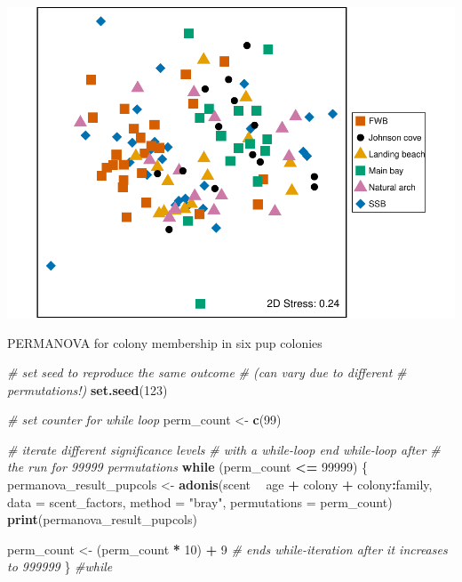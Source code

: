 \documentclass[]{article}
\newenvironment{Shaded}{\begin{snugshade}}{\end{snugshade}}
\newcommand{\KeywordTok}[1]{\textcolor[rgb]{0.13,0.29,0.53}{\textbf{#1}}}
\newcommand{\DataTypeTok}[1]{\textcolor[rgb]{0.13,0.29,0.53}{#1}}
\newcommand{\DecValTok}[1]{\textcolor[rgb]{0.00,0.00,0.81}{#1}}
\newcommand{\StringTok}[1]{\textcolor[rgb]{0.31,0.60,0.02}{#1}}
\newcommand{\CommentTok}[1]{\textcolor[rgb]{0.56,0.35,0.01}{\textit{#1}}}
\newcommand{\ControlFlowTok}[1]{\textcolor[rgb]{0.13,0.29,0.53}{\textbf{#1}}}
\newcommand{\OperatorTok}[1]{\textcolor[rgb]{0.81,0.36,0.00}{\textbf{#1}}}
\newcommand{\NormalTok}[1]{#1}
\begin{document}
\includegraphics{SealScent_SI_Markdown_2020_1_files/figure-latex/unnamed-chunk-5-1.pdf}

PERMANOVA for colony membership in six pup colonies

\begin{Shaded}
\begin{Highlighting}[]
\CommentTok{# set seed to reproduce the same outcome}
\CommentTok{# (can vary due to different}
\CommentTok{# permutations!)}
\KeywordTok{set.seed}\NormalTok{(}\DecValTok{123}\NormalTok{)}

\CommentTok{# set counter for while loop}
\NormalTok{perm_count <-}\StringTok{ }\KeywordTok{c}\NormalTok{(}\DecValTok{99}\NormalTok{)}

\CommentTok{# iterate different significance levels}
\CommentTok{# with a while-loop end while-loop after}
\CommentTok{# the run for 99999 permutations}
\ControlFlowTok{while}\NormalTok{ (perm_count }\OperatorTok{<=}\StringTok{ }\DecValTok{99999}\NormalTok{) \{}
\NormalTok{    permanova_result_pupcols <-}\StringTok{ }\KeywordTok{adonis}\NormalTok{(scent }\OperatorTok{~}\StringTok{ }
\StringTok{        }\NormalTok{age }\OperatorTok{+}\StringTok{ }\NormalTok{colony }\OperatorTok{+}\StringTok{ }\NormalTok{colony}\OperatorTok{:}\NormalTok{family, }\DataTypeTok{data =}\NormalTok{ scent_factors, }
        \DataTypeTok{method =} \StringTok{"bray"}\NormalTok{, }\DataTypeTok{permutations =}\NormalTok{ perm_count)}
    \KeywordTok{print}\NormalTok{(permanova_result_pupcols)}
    
\NormalTok{    perm_count <-}\StringTok{ }\NormalTok{(perm_count }\OperatorTok{*}\StringTok{ }\DecValTok{10}\NormalTok{) }\OperatorTok{+}\StringTok{ }\DecValTok{9}  \CommentTok{# ends while-iteration after it increases to 999999}
\NormalTok{\}  }\CommentTok{#while }
\end{Highlighting}
\end{Shaded}
\end{document}
